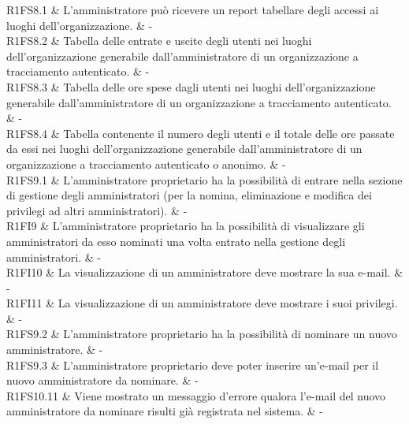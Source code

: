 R1FS8.1 & L'amministratore può ricevere un report tabellare degli accessi ai luoghi dell'organizzazione.  & - \\

R1FS8.2 &  Tabella delle entrate e uscite degli utenti nei luoghi dell'organizzazione generabile dall'amministratore di un organizzazione a tracciamento autenticato.  & - \\

R1FS8.3 & Tabella delle ore spese dagli utenti nei luoghi dell'organizzazione generabile dall'amministratore di un organizzazione a tracciamento autenticato.  & - \\

R1FS8.4 & Tabella contenente il numero degli utenti e il totale delle ore passate da essi nei luoghi dell'organizzazione generabile dall'amministratore di un organizzazione a tracciamento autenticato o anonimo.  & - \\




R1FS9.1 & L'amministratore proprietario ha la possibilità di entrare nella sezione di gestione degli amministratori (per la nomina, eliminazione e modifica dei privilegi ad altri amministratori).  & - \\

R1FI9 & L'amministratore proprietario ha la possibilità di visualizzare gli amministratori da esso nominati una volta entrato nella gestione degli amministratori.  & - \\

R1FI10 & La visualizzazione di un amministratore deve mostrare la sua e-mail.  & - \\

R1FI11 & La visualizzazione di un amministratore deve mostrare i suoi privilegi.  & - \\

R1FS9.2 & L'amministratore proprietario ha la possibilità di nominare un nuovo amministratore.  & - \\

R1FS9.3 & L'amministratore proprietario deve poter inserire un'e-mail per il nuovo amministratore da nominare.  & - \\

R1FS10.11 & Viene mostrato un messaggio d'errore qualora l'e-mail del nuovo amministratore da nominare risulti già registrata nel sistema.  & - \\

